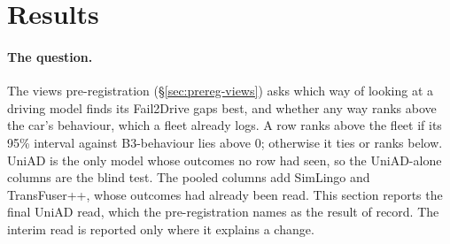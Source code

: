 \section{Results}
\label{sec:results}

\begin{center}
\end{center}


\newcommand{\dci}[3]{\begin{tabular}[t]{@{}c@{}}$#1$\\[-1pt]{\scriptsize$[#2, #3]$}\end{tabular}}
\newcommand{\dcib}[3]{\begin{tabular}[t]{@{}c@{}}$\boldsymbol{#1}$\\[-1pt]{\scriptsize$\boldsymbol{[#2, #3]}$}\end{tabular}}

\paragraph{The question.}
The views pre-registration (\S\ref{sec:prereg-views}) asks which way of looking
at a driving model finds its Fail2Drive gaps best, and whether any way ranks
above the car's behaviour, which a fleet already logs. A row ranks above the
fleet if its 95\% interval against B3-behaviour lies above 0; otherwise it ties
or ranks below. UniAD is the only model whose outcomes no row had seen, so the
UniAD-alone columns are the blind test. The pooled columns add SimLingo and
TransFuser++, whose outcomes had already been read. This section reports the
final UniAD read, which the pre-registration names as the result of record. The
interim read is reported only where it explains a change.

